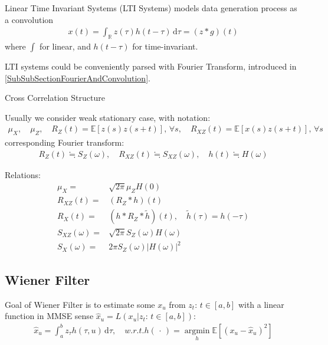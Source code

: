 Linear Time Invariant Systems (LTI Systems) models data generation process as a convolution
\begin{align}
    x(t)=\int _\mathbb{R}z(\tau)h(t-\tau) \,\mathrm{d}\tau = (z*g)(t)
\end{align}
where $ \int $ for linear, and $ h(t-\tau) $ for time-invariant.

LTI systems could be conveniently parsed with Fourier Transform, introduced in \autoref{SubSubSectionFourierAndConvolution}.

\begin{point}
    Cross Correlation Structure
\end{point}

Usually we consider weak stationary case, with notation:
\begin{align}
    \mu _X,\quad \mu _Z,\quad  R_Z(t)=\mathbb{E}\left[ z(s)z(s+t) \right],\,\forall s,\quad R_{XZ}(t)=\mathbb{E}\left[ x(s)z(s+t) \right],\,\forall s  
\end{align}
corresponding Fourier transform:
\begin{align}
    R_Z(t)\fallingdotseq S_Z(\omega ),\quad R_{XZ}(t)\fallingdotseq S_{XZ}(\omega ) ,\quad h(t)\fallingdotseq H(\omega )
\end{align}

Relations:
\begin{align}
    \mu _X=&  \sqrt{2\pi}\mu _ZH(0) \\
    R_{XZ}(t)=&(R_Z*h)(t)\\
    R_{X}(t)=&(h*R_Z*\tilde{h})(t),\quad \tilde{h}(\tau)=h(-\tau)\\
    S_{XZ}(\omega )=&\sqrt{2\pi}S_Z(\omega )H(\omega )\\
    S_X(\omega )=&2\pi S_Z(\omega )|H(\omega )|^2
\end{align}


\subsection{Wiener Filter}
Goal of Wiener Filter is to estimate some $ x_u $ from $ z_t:\,t\in[a,b] $ with a linear function in MMSE sense $ \hat{x}_u=L(x_u|z_t:\,t\in[a,b]) $:
\begin{align}
    \hat{x}_u=\int _a^b z_\tau h(\tau,u) \,\mathrm{d}\tau ,\quad w.r.t. h(\, \cdot \, )=\mathop{\arg\min}\limits_{h}\mathbb{E}\left[ (x_u-\hat{x}_u) ^2\right]  
\end{align}


